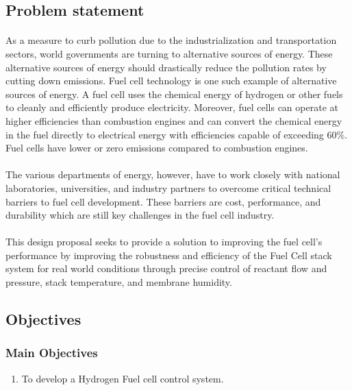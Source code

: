\subsection{Problem statement}
\paragraph{}As a measure to curb pollution due to the industrialization and transportation sectors, world governments are turning to alternative sources of energy. These alternative sources of energy should drastically reduce the pollution rates by cutting down emissions. Fuel cell technology is one such example of alternative sources of energy. A fuel cell uses the chemical energy of hydrogen or other fuels to cleanly and efficiently produce electricity. Moreover, fuel cells can operate at higher efficiencies than combustion engines and can convert the chemical energy in the fuel directly to electrical energy with efficiencies capable of exceeding 60\%. Fuel cells have lower or zero emissions compared to combustion engines.
\paragraph{}The various departments of energy, however,  have to work closely with national laboratories, universities, and industry partners to overcome critical technical barriers to fuel cell development. These barriers are cost, performance, and durability which are still key challenges in the fuel cell industry. 
\paragraph{}This design proposal seeks to provide a solution to improving the fuel cell’s performance by improving the robustness and efficiency of the Fuel Cell stack system for real world conditions through precise control of reactant flow and pressure, stack temperature, and membrane humidity.
\subsection{Objectives}
\subsubsection{Main Objectives}
\begin{enumerate}
\item To develop a Hydrogen Fuel cell control system.
\end{enumerate}
